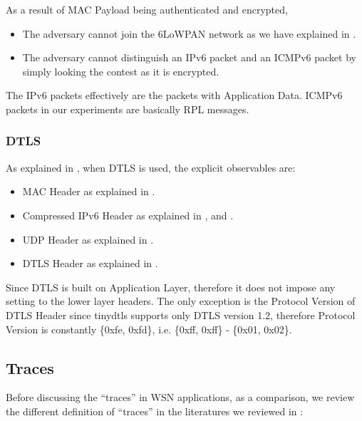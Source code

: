 As a result of MAC Payload being authenticated and encrypted, 
\begin{itemize}
	\item The adversary cannot join the 6LoWPAN network as we have explained in .
	\item The adversary cannot distinguish an IPv6 packet and an ICMPv6 packet by simply looking the contest as it is encrypted. 
\end{itemize}

The IPv6 packets effectively are the packets with Application Data. ICMPv6 packets in our experiments are basically RPL messages.

\subsubsection{DTLS}

As explained in , when DTLS is used, the explicit observables are: 

\begin{itemize}
	\item MAC Header as explained in .
	
	\item Compressed IPv6 Header as explained in ,  and .
	
	\item UDP Header as explained in .
	
	\item DTLS Header as explained in .
\end{itemize}

Since DTLS is built on Application Layer, therefore it does not impose any setting to the lower layer headers. The only exception is the Protocol Version of DTLS Header since tinydtls supports only DTLS version 1.2, therefore Protocol Version is constantly \{0xfe, 0xfd\}, i.e. \{0xff, 0xff\} - \{0x01, 0x02\}.

\subsection{Traces} \label{Subsec: Traces}

Before discussing the ``traces'' in WSN applications, as a comparison, we review the different definition of ``traces'' in the literatures we reviewed in :

